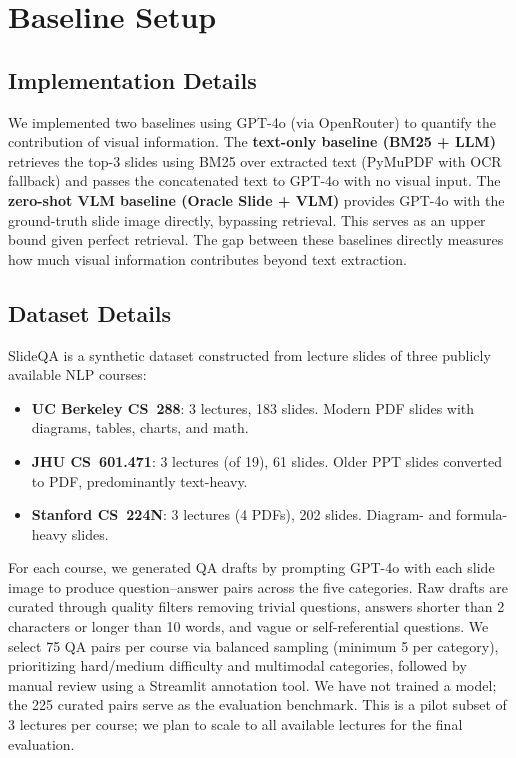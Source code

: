 \documentclass{article} %
\begin{document}
\section{Baseline Setup}

\subsection{Implementation Details}

We implemented two baselines using GPT-4o (via OpenRouter) to quantify the contribution of visual information. The \textbf{text-only baseline (BM25 + LLM)} retrieves the top-3 slides using BM25 over extracted text (PyMuPDF with OCR fallback) and passes the concatenated text to GPT-4o with no visual input. The \textbf{zero-shot VLM baseline (Oracle Slide + VLM)} provides GPT-4o with the ground-truth slide image directly, bypassing retrieval. This serves as an upper bound given perfect retrieval. The gap between these baselines directly measures how much visual information contributes beyond text extraction.

\subsection{Dataset Details}

SlideQA is a synthetic dataset constructed from lecture slides of three publicly available NLP courses:

\begin{itemize}[nosep]
    \item \textbf{UC Berkeley CS~288}: 3 lectures, 183 slides. Modern PDF slides with diagrams, tables, charts, and math.
    \item \textbf{JHU CS~601.471}: 3 lectures (of 19), 61 slides. Older PPT slides converted to PDF, predominantly text-heavy.
    \item \textbf{Stanford CS~224N}: 3 lectures (4 PDFs), 202 slides. Diagram- and formula-heavy slides.
\end{itemize}

For each course, we generated QA drafts by prompting GPT-4o with each slide image to produce question--answer pairs across the five categories. Raw drafts are curated through quality filters removing trivial questions, answers shorter than 2 characters or longer than 10 words, and vague or self-referential questions. We select 75 QA pairs per course via balanced sampling (minimum 5 per category), prioritizing hard/medium difficulty and multimodal categories, followed by manual review using a Streamlit annotation tool. We have not trained a model; the 225 curated pairs serve as the evaluation benchmark. This is a pilot subset of 3 lectures per course; we plan to scale to all available lectures for the final evaluation.
\end{document}
